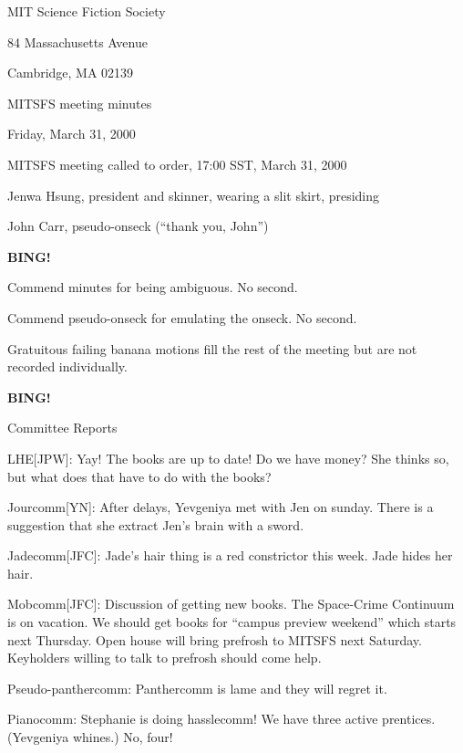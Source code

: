 \documentclass[12pt]{article}
\begin{document}
\begin{center}

MIT Science Fiction Society 

84 Massachusetts Avenue

Cambridge, MA 02139

\vspace{12pt}

MITSFS meeting minutes

Friday, March 31, 2000

\end{center}

\vskip 12pt

MITSFS meeting called to order, 17:00 SST, March 31, 2000

Jenwa Hsung, president and skinner, wearing a slit skirt, presiding

John Carr, pseudo-onseck (``thank you, John'')

{\bf BING!}

\vskip 12pt

Commend minutes for being ambiguous.  No second.

Commend pseudo-onseck for emulating the onseck.  No second.

Gratuitous failing banana motions fill the rest of the meeting but are
not recorded individually.

{\bf BING!}

\vskip 12pt

\centerline{Committee Reports}

LHE[JPW]: Yay! The books are up to date!  Do we have money?  She thinks
so, but what does that have to do with the books?

Jourcomm[YN]: After delays, Yevgeniya met with Jen on sunday.
There is a suggestion that she extract Jen's brain with a sword.

Jadecomm[JFC]: Jade's hair thing is a red constrictor this week.
Jade hides her hair.

Mobcomm[JFC]: Discussion of getting new books.  The Space-Crime
Continuum is on vacation.  We should get books for ``campus
preview weekend'' which starts next Thursday.  Open house will
bring prefrosh to MITSFS next Saturday.  Keyholders willing to
talk to prefrosh should come help.

Pseudo-panthercomm: Panthercomm is lame and they will regret it.

Pianocomm: Stephanie is doing hasslecomm!  We have three active
prentices.  (Yevgeniya whines.)  No, four!
\end{document}
